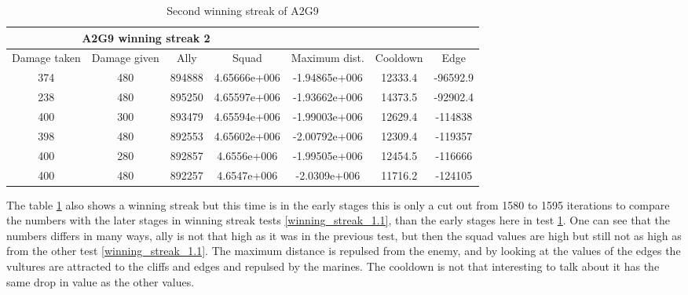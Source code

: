 \begin{centering}
\begin{table}
 \begin{tabular}{|c|c|c|c|c|c|c|}
	\multicolumn{4}{c}{A2G9 winning streak 2} \\
	\hline
	Damage taken & Damage given & Ally & Squad & Maximum dist. & Cooldown & Edge \\
	\hline
			374&480&894888&4.65666e+006&-1.94865e+006&12333.4&-96592.9\\
			238&480&895250&4.65597e+006&-1.93662e+006&14373.5&-92902.4\\
			400&300&893479&4.65594e+006&-1.99003e+006&12629.4&-114838\\
			398&480&892553&4.65602e+006&-2.00792e+006&12309.4&-119357\\
			400&280&892857&4.6556e+006&-1.99505e+006&12454.5&-116666\\
			400&480&892257&4.6547e+006&-2.0309e+006&11716.2&-124105\\
	\hline
\end{tabular}
	\label{winning_streak_1.2}
	\caption{Second winning streak of A2G9}
	\end{table}
\end{centering}
The table \ref{winning_streak_1.2} also shows a winning streak but this time is in the early stages this is only a cut out from 1580 to 1595 iterations to compare the numbers with the later stages in winning streak tests \ref{winning_streak_1.1}, than the early stages here in test \ref{winning_streak_1.2}. One can see that the numbers differs in many ways, ally is not that high as it was in the previous test, but then the squad values are high but still not as high as from the other test \ref{winning_streak_1.1}. The maximum distance is repulsed from the enemy, and by looking at the values of the edges the vultures are attracted to the cliffs and edges and repulsed by the marines. The cooldown is not that interesting to talk about it has the same drop in value as the other values.

